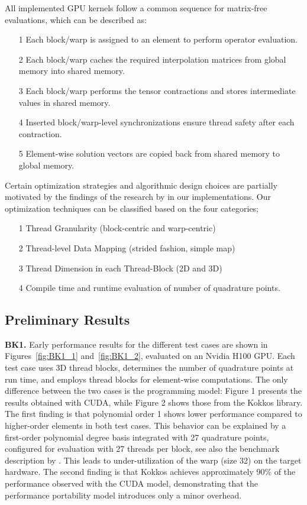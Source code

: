 \documentclass[a4paper,12pt]{article}
\begin{document}
All implemented GPU kernels follow a common sequence for matrix-free evaluations, which can be described as:
\begin{itemize}
\item[1] Each block/warp is assigned to an element to perform operator evaluation.
\item [2] Each block/warp caches the required interpolation matrices from global memory into shared memory.
\item[3] Each block/warp performs the tensor contractions and stores intermediate values in shared memory.
\item[4] Inserted block/warp-level synchronizations ensure thread safety after each contraction.
\item[5] Element-wise solution vectors are copied back from shared memory to global memory.
\end{itemize}

Certain optimization strategies and algorithmic design choices are partially motivated by the findings of the research by \cite{Swiry2019} in our implementations. Our optimization techniques can be classified based on the four categories;
\begin{itemize}
\item[1] Thread Granularity (block-centric and warp-centric)
\item [2] Thread-level Data Mapping (strided fashion, simple map)
\item[3] Thread Dimension in each Thread-Block (2D and 3D)
\item[4] Compile time and runtime evaluation of number of quadrature points.
\end{itemize}

\subsection{Preliminary Results}

{\bf BK1.} Early performance results for the different test cases are shown in Figures~\ref{fig:BK1_1} and~\ref{fig:BK1_2}, evaluated on an Nvidia H100 GPU. Each test case uses 3D thread blocks, determines the number of quadrature points at run time, and employs thread blocks for element-wise computations. The only difference between the two cases is the programming model: Figure 1 presents the results obtained with CUDA, while Figure 2 shows those from the Kokkos library.
The first finding is that polynomial order 1 shows lower performance compared to higher-order elements in both test cases. This behavior can be explained by a first-order polynomial degree basis integrated with 27 quadrature points, configured for evaluation with 27 threads per block, see also the benchmark description by \cite{Fischer2020}. This leads to under-utilization of the warp (size 32) on the target hardware.
The second finding is that Kokkos achieves approximately 90\% of the performance observed with the CUDA model, demonstrating that the performance portability model introduces only a minor overhead.
\end{document}
